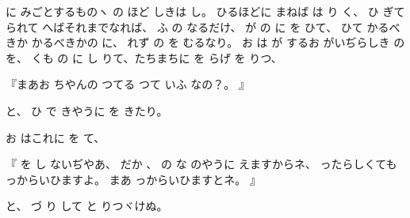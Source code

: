 に
みごとするものヽ
の
ほど
しきは
し。
ひるほどに
まねば
は
り
く、
ひ
ぎて
られて
へばそれまでなれば、
ふ
の
なるだけ、
が
の
に
を
ひて、
ひて
かるべきか
かるべきかの
に、
れず
の
を
むるなり。
お
は
が
するお
がいぢらしき
の
を、
くも
の
に
し
りて、たちまちに
を
らげ
を
りつ、

『まあお
ちやんの
つてる
つて
いふ
なの？。
』

と、
ひ
で
きやうに
を
きたり。

お
はこれに
を
て、

『
を
し
ないぢやあ、
だか
、
の
な
のやうに
えますからネ、
ったらしくても
っからいひますよ。
まあ
っからいひますとネ。
』

と、
づ
り
して
と
りつヾけぬ。

